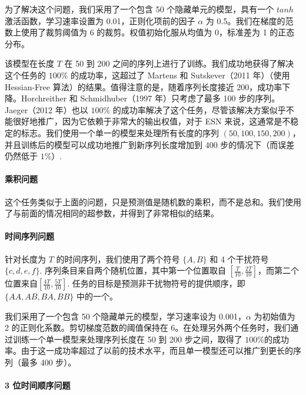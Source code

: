 为了解决这个问题，我们采用了一个包含 50 个隐藏单元的模型，具有一个 \(tanh\) 激活函数，学习速率设置为 0.01，正则化项前的因子 \(\alpha\) 为 0.5。我们在梯度的范数上使用了裁剪阈值为 6 的裁剪。权值初始化服从均值为 0，标准差为 1 的正态分布。

该模型在长度 \(T\) 在 50 到 200 之间的序列上进行了训练。我们成功地获得了解决这个任务的 \(100\%\) 的成功率，这超过了 Martens 和 Sutskever（2011 年）（使用 Hessian-Free 算法）的结果。值得注意的是，随着序列长度接近 200，成功率下降。Horchreither 和 Schmidhuber（1997 年）只考虑了最多 100 步的序列。Jaeger（2012 年）也以 \(100\%\) 的成功率解决了这个任务，尽管该解决方案似乎不能很好地推广，因为它依赖于非常大的输出权值，对于 ESN 来说，这通常是不稳定的标志。我们使用一个单一的模型来处理所有长度的序列 \((50, 100, 150, 200)\)，并且训练后的模型可以成功地推广到新序列长度增加到 400 步的情况下（而误差仍然低于 \(1\%\)）.

\paragraph{乘积问题}\label{ux4e58ux79efux95eeux9898}

这个任务类似于上面的问题，只是预测值是随机数的乘积，而不是总和。我们使用了与前面的情况相同的超参数，并得到了非常相似的结果。

\paragraph{时间序列问题}\label{ux65f6ux95f4ux5e8fux5217ux95eeux9898}

针对长度为 \(T\) 的时间序列，我们使用了两个符号 \(\{A,B\}\) 和 4 个干扰符号 \(\{c,d,e,f\}\). 序列条目来自两个随机位置，其中第一个位置取自 \([\frac{T}{10},\frac{2T}{10}]\)，而第二个位置来自\([\frac{4T}{10}, \frac{5T}{10}]\). 任务的目标是预测非干扰物符号的提供顺序，即 \(\{AA, AB, BA, BB\}\) 中的一个。

我们采用了一个包含 50 个隐藏单元的模型，学习速率设为 0.001，\(\alpha\) 为初始值为 2 的正则化系数。剪切梯度范数的阈值保持在 6。在处理另外两个任务时，我们通过训练一个单一模型来处理序列长度在 50 到 200 步之间，取得了 \(100\%\)的成功率。由于这一成功率超过了以前的技术水平，而且单一模型还可以推广到更长的序列（最多 400 步）。

\paragraph{3 位时间顺序问题}\label{3-ux4f4dux65f6ux95f4ux987aux5e8fux95eeux9898}

